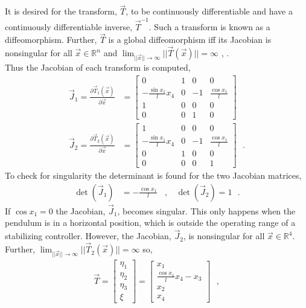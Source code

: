 %
It is desired for the transform, $\vec{T}$, to be continuously differentiable and have a continuously differentiable inverse, $\vec{T}^{-1}$. Such a transform is known as a diffeomorphism. Further, $\vec{T}$ is a global diffeomorphism iff its Jacobian is nonsingular for all $\vec{x} \in \mathbb{R}^n$ and $\lim_{||\vec{x}||\rightarrow \infty}||\vec{T}(\vec{x})|| = \infty$ , \cite{HKKhalil}.\\
Thus the Jacobian of each transform is computed,
\begin{align}
  \vec{J}_1 = \frac{\partial \vec{T}_1(\vec{x})}{\partial \vec{x}}
  &=
  \begin{bmatrix}
    0                       & 1 &  0 & 0                  \\
    -\frac{\sin x_1}{l} x_4 & 0 & -1 & \frac{\cos x_1}{l} \\
    1                       & 0 &  0 & 0                  \\
    0                       & 0 &  1 & 0
  \end{bmatrix}  \label{eq:transform_h_x1} \\
  \vec{J}_2 = \frac{\partial \vec{T}_2(\vec{x})}{\partial \vec{x}}
  &=
  \begin{bmatrix}
    1                       & 0 &  0 & 0                  \\
    -\frac{\sin x_1}{l} x_4 & 0 & -1 & \frac{\cos x_1}{l} \\
    0                       & 1 &  0 & 0                  \\
    0                       & 0 &  0 & 1
  \end{bmatrix} \ \ \ . \label{eq:transform_h_x2}
\end{align}
To check for singularity the determinant is found for the two Jacobian matrices,
\begin{align}
  \det(\vec{J}_1) &= -\frac{\cos x_1}{l} \ \ \ \ , \ \ \ \  \det(\vec{J}_2) = 1 \ \ \ . \label{eq:determinantOfJ1andJ2}
\end{align}
If $\cos x_1 = 0$ the Jacobian, $\vec{J}_1$, becomes singular. This only happens when the pendulum is in a horizontal position, which is outside the operating range of a stabilizing controller. However, the Jacobian, $\vec{J}_2$, is nonsingular for all $\vec{x} \in \mathbb{R}^4$. Further, $\lim_{||\vec{x}||\rightarrow \infty}||\vec{T}_2(\vec{x})|| = \infty$ so,
\begin{align}
  \vec{T}
  = 
  \begin{bmatrix}
    \eta_1   \\
    \eta_2   \\
    \eta_3   \\
    \xi
  \end{bmatrix}
  =
  \begin{bmatrix}
    x_1   \\
    \frac{\cos x_1}{l} x_4 - x_3  \\
    x_2   \\
    x_4
  \end{bmatrix} \ \ \ , \label{eq:transform}
\end{align}
